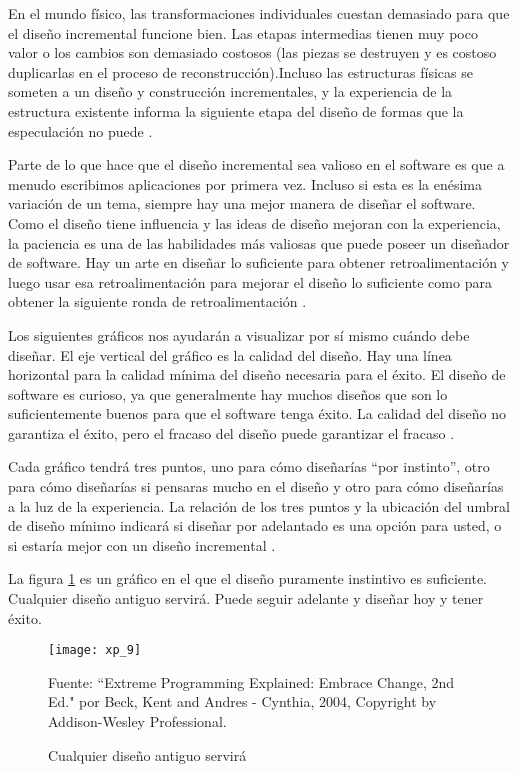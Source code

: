 \begin{spacing}{1.5}
				En el mundo físico, las transformaciones individuales cuestan demasiado para que el diseño incremental funcione bien. Las etapas intermedias tienen muy poco valor o los cambios son demasiado costosos (las piezas se destruyen y es costoso duplicarlas en el proceso de reconstrucción).Incluso las estructuras físicas se someten a un diseño y construcción incrementales, y la experiencia de la estructura existente informa la siguiente etapa del diseño de formas que la especulación no puede \cite{chap2_extreme_programming}.
				
				Parte de lo que hace que el diseño incremental sea valioso en el software es que a menudo escribimos aplicaciones por primera vez. Incluso si esta es la enésima variación de un tema, siempre hay una mejor manera de diseñar el software. Como el diseño tiene influencia y las ideas de diseño mejoran con la experiencia, la paciencia es una de las habilidades más valiosas que puede poseer un diseñador de software. Hay un arte en diseñar lo suficiente para obtener retroalimentación y luego usar esa retroalimentación para mejorar el diseño lo suficiente como para obtener la siguiente ronda de retroalimentación \cite{chap2_extreme_programming}.
				
				Los siguientes gráficos nos ayudarán a visualizar por sí mismo cuándo debe diseñar. El eje vertical del gráfico es la calidad del diseño. Hay una línea horizontal para la calidad mínima del diseño necesaria para el éxito. El diseño de software es curioso, ya que generalmente hay muchos diseños que son lo suficientemente buenos para que el software tenga éxito. La calidad del diseño no garantiza el éxito, pero el fracaso del diseño puede garantizar el fracaso \cite{chap2_extreme_programming}.
				
				Cada gráfico tendrá tres puntos, uno para cómo diseñarías ``por instinto'', otro para cómo diseñarías si pensaras mucho en el diseño y otro para cómo diseñarías a la luz de la experiencia. La relación de los tres puntos y la ubicación del umbral de diseño mínimo indicará si diseñar por adelantado es una opción para usted, o si estaría mejor con un diseño incremental \cite{chap2_extreme_programming}.
				
				La figura \ref{figure:chaperII_10} es un gráfico en el que el diseño puramente instintivo es suficiente. Cualquier diseño antiguo servirá. Puede seguir adelante y diseñar hoy y tener éxito.
				\begin{figure}[H]
					\centering
					\texttt{[image: xp\_9]}
					\caption {\centering \small{Cualquier diseño antiguo servirá}} \label{figure:chaperII_10}
					\small {Fuente: ``Extreme Programming Explained: Embrace Change, 2nd Ed." por Beck, Kent and Andres - Cynthia, 2004, Copyright by Addison-Wesley Professional.}
				\end{figure}
				

\end{spacing}
